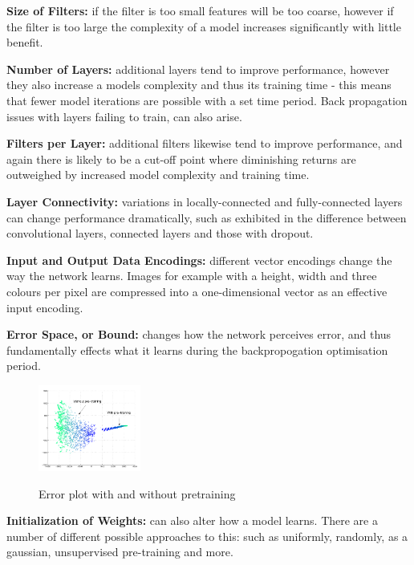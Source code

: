 \documentclass[a4paper,11pt,titlepage]{article}
\begin{document}
		\par
		\textbf{Size of Filters:} if the filter is too small features will be too coarse, however if the filter is too large the complexity of a model increases significantly with little benefit.
		\par
		\textbf{Number of Layers:} additional layers tend to improve performance, however they also increase a models complexity and thus its training time - this means that fewer model iterations are possible with a set time period. Back propagation issues with layers failing to train, can also arise.
		\par 
		\textbf{Filters per Layer:} additional filters likewise tend to improve performance, and again there is likely to be a cut-off point where diminishing returns are outweighed by increased model complexity and training time.
		\par  
		\textbf{Layer Connectivity:} variations in locally-connected and fully-connected layers can change performance dramatically, such as exhibited in the difference between convolutional layers, connected layers and those with dropout.
		\par 
		\textbf{Input and Output Data Encodings:} different vector encodings change the way the network learns. Images for example with a height, width and three colours per pixel are compressed into a one-dimensional vector as an effective input encoding.
		\par  		
		\textbf{Error Space, or Bound:} changes how the network perceives error, and thus fundamentally effects what it learns during the backpropogation optimisation period.
		\par
		
		\begin{figure}[H]
    			\centering	
			{{\includegraphics[width=0.3\textwidth]
    				{img/erhan_pretraining_versus.png} 
    			}}%
    			\caption{Error plot with and without pretraining}%
    			\label{fig:Error}
		\end{figure}	
		 		
		\textbf{Initialization of Weights:} can also alter how a model learns. There are a number of different possible approaches to this: such as uniformly, randomly, as a gaussian, unsupervised pre-training and more.
		
\end{document}
